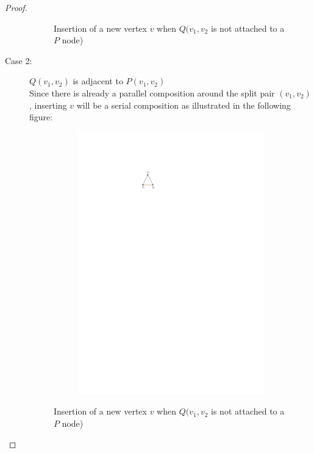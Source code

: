 \begin{proof}
\begin{description}
\begin{figure}[H]
\begin{subfigure}{\textwidth}
			\end{subfigure}
			\caption{Insertion of a new vertex $v$ when $Q(v_1,v_2$ is not attached to a $P$ node)}\label{im:SPQR_insert_2}
		\end{figure}
		\item[Case 2:] $Q(v_1,v_2)$ is adjacent to $P(v_1,v_2)$\\
		Since there is already a parallel composition around the split pair $(v_1,v_2)$, inserting $v$ will be a serial composition as illustrated in the following figure:
		\begin{figure}[H]
			\begin{subfigure}{\textwidth}
				\centering
				\includegraphics[page=4,width=\linewidth]{graphics/SP_graphs_SPQR_inserting.pdf}
			\end{subfigure}
			\caption{Insertion of a new vertex $v$ when $Q(v_1,v_2$ is not attached to a $P$ node)}\label{im:SPQR_insert_2}

\end{figure}
\end{description}
\end{proof}
